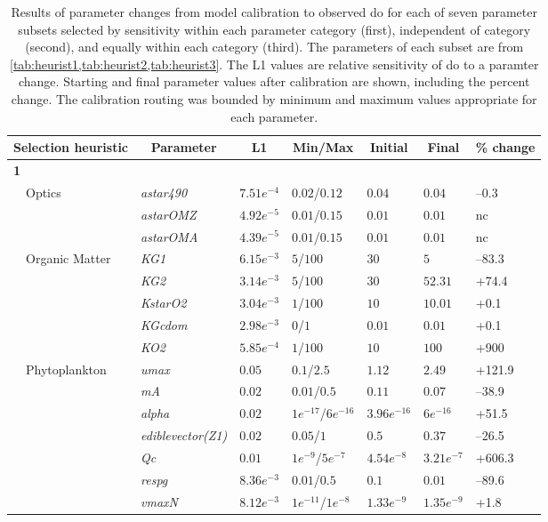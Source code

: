 \documentclass[review]{elsarticle}\usepackage[]{graphicx}\usepackage[]{color}
\begin{document}
\begin{table}[!tbp]
{\scriptsize
\caption{Results of parameter changes from model calibration to observed \ac{do} for each of seven parameter subsets selected by sensitivity within each parameter category (first), independent of category (second), and equally within each category (third). The parameters of each subset are from \cref{tab:heurist1,tab:heurist2,tab:heurist3}.  The L1 values are relative sensitivity of \ac{do} to a paramter change.  Starting and final parameter values after calibration are shown, including the percent change.  The calibration routing was bounded by minimum and maximum values appropriate for each parameter.\label{tab:calibprm}} 
\begin{center}
\begin{tabular}{lllllll}
\hline\hline
\multicolumn{1}{l}{Selection heuristic}&\multicolumn{1}{c}{Parameter}&\multicolumn{1}{c}{L1}&\multicolumn{1}{c}{Min/Max}&\multicolumn{1}{c}{Initial}&\multicolumn{1}{c}{Final}&\multicolumn{1}{c}{\% change}\tabularnewline
\hline
{\bfseries 1}&&&&&&\tabularnewline
~~Optics&\textit{astar490}&$7.51e^{-4}$&$0.02$/$0.12$&$0.04$&$0.04$&--0.3\tabularnewline
~~&\textit{astarOMZ}&$4.92e^{-5}$&$0.01$/$0.15$&$0.01$&$0.01$&nc\tabularnewline
~~&\textit{astarOMA}&$4.39e^{-5}$&$0.01$/$0.15$&$0.01$&$0.01$&nc\tabularnewline
~~Organic Matter&\textit{KG1}&$6.15e^{-3}$&$5$/$100$&$30$&$5$&--83.3\tabularnewline
~~&\textit{KG2}&$3.14e^{-3}$&$5$/$100$&$30$&$52.31$&+74.4\tabularnewline
~~&\textit{KstarO2}&$3.04e^{-3}$&$1$/$100$&$10$&$10.01$&+0.1\tabularnewline
~~&\textit{KGcdom}&$2.98e^{-3}$&$0$/$1$&$0.01$&$0.01$&+0.1\tabularnewline
~~&\textit{KO2}&$5.85e^{-4}$&$1$/$100$&$10$&$100$&+900\tabularnewline
~~Phytoplankton&\textit{umax}&$0.05$&$0.1$/$2.5$&$1.12$&$2.49$&+121.9\tabularnewline
~~&\textit{mA}&$0.02$&$0.01$/$0.5$&$0.11$&$0.07$&--38.9\tabularnewline
~~&\textit{alpha}&$0.02$&$1e^{-17}$/$6e^{-16}$&$3.96e^{-16}$&$6e^{-16}$&+51.5\tabularnewline
~~&\textit{ediblevector(Z1)}&$0.02$&$0.05$/$1$&$0.5$&$0.37$&--26.5\tabularnewline
~~&\textit{Qc}&$0.01$&$1e^{-9}$/$5e^{-7}$&$4.54e^{-8}$&$3.21e^{-7}$&+606.3\tabularnewline
~~&\textit{respg}&$8.36e^{-3}$&$0.01$/$0.5$&$0.1$&$0.01$&--89.6\tabularnewline
~~&\textit{vmaxN}&$8.12e^{-3}$&$1e^{-11}$/$1e^{-8}$&$1.33e^{-9}$&$1.35e^{-9}$&+1.8\tabularnewline

\end{tabular}
\end{center}}
\end{table}
\end{document}
